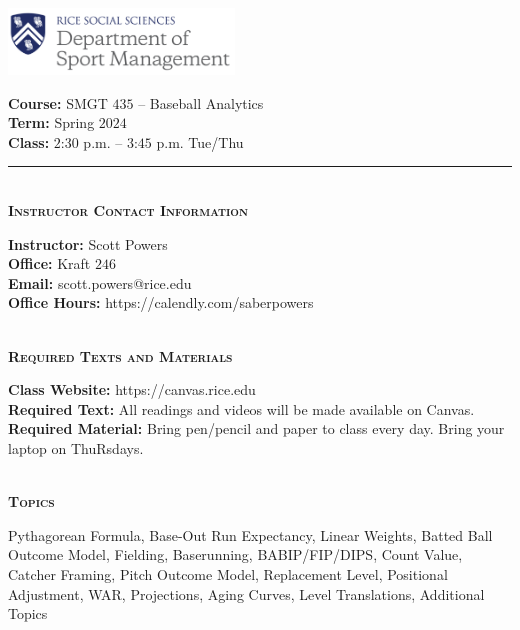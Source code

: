 \documentclass[11pt]{article}
\begin{document}
\begin{multicols}{2}

	\includegraphics[width = 0.45\textwidth]{../../images/rice_smgt.png}

	\columnbreak

	\raggedleft
	{\bf Course:} SMGT $435$ -- Baseball Analytics\\
	{\bf Term:} Spring $2024$\\
	{\bf Class:} $2$:$30$ p.m. -- $3$:$45$ p.m. Tue/Thu

\end{multicols}

\hrule

~\\
\textbf{\textsc{Instructor Contact Information}}
\begin{adjustwidth}{1cm}{0cm}
	{\bf Instructor:} Scott Powers\\
  {\bf Office:} Kraft $246$\\
  {\bf Email:} scott.powers@rice.edu\\
  {\bf Office Hours:} https://calendly.com/saberpowers
\end{adjustwidth}

~\\
\textbf{\textsc{Required Texts and Materials}}
\begin{adjustwidth}{1cm}{0cm}
	{\bf Class Website:} https://canvas.rice.edu\\
	{\bf Required Text:} All readings and videos will be made available on Canvas.\\
	{\bf Required Material:} Bring pen/pencil and paper to class every day. Bring your laptop on ThuRsdays.
\end{adjustwidth}

~\\
\textbf{\textsc{Topics}}
\begin{adjustwidth}{1cm}{0cm}
  Pythagorean Formula, Base-Out Run Expectancy, Linear Weights, Batted Ball Outcome Model, Fielding, Baserunning, BABIP/FIP/DIPS, Count Value, Catcher Framing, Pitch Outcome Model, Replacement Level, Positional Adjustment, WAR, Projections, Aging Curves, Level Translations, Additional Topics
\end{adjustwidth}
\end{document}

